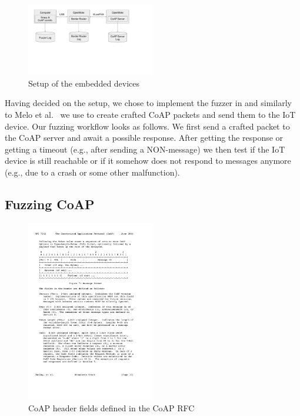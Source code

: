 \begin{figure}[h]
	\centering		
	\includegraphics[width=0.5\textwidth]{images/fuzzing_setup}
	\caption{Setup of the embedded devices}
	\label{figure:fuzzing_setup}
\end{figure}

Having decided on the setup, we chose to implement the fuzzer in \python and similarly to Melo et al.~\cite{Melo2017RobustnessTO} we use \scapy to create crafted CoAP packets and send them to the IoT device. Our fuzzing workflow looks as follows. We first send a crafted packet to the CoAP server and await a possible response. After getting the response or getting a timeout (e.g., after sending a NON-message) we then test if the IoT device is still reachable or if it somehow does not respond to messages anymore (e.g., due to a crash or some other malfunction). 

\subsection{Fuzzing CoAP}
\begin{figure}[h]
	\centering		
	\includegraphics[width=0.5\textwidth]{images/coap_message_format}
	\caption{CoAP header fields defined in the CoAP RFC~\cite{RFC7252}}
	\label{figure:coap_header}
\end{figure}

